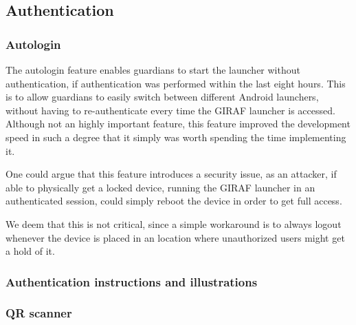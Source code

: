 \subsection{Authentication}
\label{backlog:authentication}

\subsubsection{Autologin}
\label{backlog:autologin}

The autologin feature enables guardians to start the launcher without authentication, if authentication was performed within the last eight hours. This is to allow guardians to easily switch between different Android launchers, without having to re-authenticate every time the GIRAF launcher is accessed. Although not an highly important feature, this feature improved the development speed in such a degree that it simply was worth spending the time implementing it.

One could argue that this feature introduces a security issue, as an attacker, if able to physically get a locked device, running the GIRAF launcher in an authenticated session, could simply reboot the device in order to get full access.

We deem that this is not critical, since a simple workaround is to always logout whenever the device is placed in an location where unauthorized users might get a hold of it.

\subsubsection{Authentication instructions and illustrations}
\label{backlog:authentication_illustrations}


\subsubsection{QR scanner}
\label{backlog:QR_scanner}

